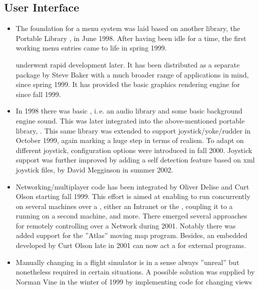 \subsection{User Interface}
\begin{itemize}
\item The foundation for a menu system was laid based on another library,
 the Portable Library \PLIB{}, in June 1998. After having been idle for a time, the first working menu entries came to life in spring 1999.
 
  \PLIB{} underwent rapid development later. It has been distributed as a separate package by
  Steve Baker with a much broader range of applications in mind, since spring 1999. It  has provided the basic graphics rendering engine for \FlightGear{} since fall 1999. 
\item In 1998 there was basic , i.\,e. an audio library
and some basic background engine sound. This was later integrated into the
above-mentioned portable library, \PLIB{}. This same library was extended to
support joystick/yoke/rudder in October 1999, again marking a huge step
in terms of realism. To adapt on different joystick, configuration options were
introduced in fall 2000. Joystick support was further improved by adding a self detection feature based on xml joystick files, by David Megginson in summer 2002.
\item Networking/multiplayer
 code has been integrated by Oliver Delise  and Curt
Olson starting fall 1999. This effort is aimed at enabling
\FlightGear{}  to run concurrently on several machines over a , either an Intranet or the , coupling it to a  running on a second
machine, and more. There emerged several approaches for remotely controlling \FlightGear{} over a Network during 2001. Notably there was added support for the ''Atlas'' moving map program. Besides, an embedded  developed by Curt Olson late in 2001 can now act a  for external programs.
\item Manually changing  in a flight simulator is in a sense always ''unreal'' but
nonetheless required in certain situations. A possible solution was supplied by Norman
Vine in the winter of 1999 by implementing code for changing views

\end{itemize}
